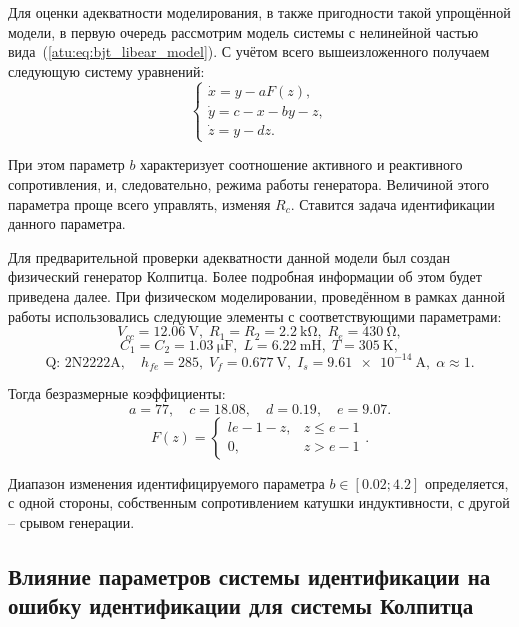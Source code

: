 Для оценки адекватности моделирования, в также пригодности
такой упрощённой модели, в первую очередь
рассмотрим модель системы с нелинейной частью вида~(\ref{atu:eq:bjt_libear_model}).
С учётом всего вышеизложенного получаем следующую систему уравнений:
%
\begin{equation}
\label{atu:eq:colp}
\begin{cases}
  \dot{x} = y - a F(z), \\
  \dot{y} = c - x - by - z, \\
  \dot{z} = y - d z.
\end{cases}
\end{equation}

При этом параметр $b$ характеризует соотношение
активного и реактивного сопротивления,
и, следовательно, режима работы генератора.
Величиной этого параметра проще всего управлять,
изменяя $R_c$.
Ставится задача идентификации данного параметра.


Для предварительной проверки адекватности данной модели
был создан физический генератор Колпитца.
Более подробная информации об этом будет приведена далее.
При физическом моделировании, проведённом в рамках данной работы использовались следующие
элементы с соответствующими параметрами:
%
\[
  V_{cc} = \SI{12.06}{\volt},          \;
  R_1 = R_2 = \SI{2.2}{\kilo\ohm},     \;
  R_e = \SI{430}{\ohm},
\]
%
\[
  C_1 = C_2 = \SI{1.03}{\micro\farad}, \;
  L = \SI{6.22}{\milli\henry},         \;
  T = \SI{305}{\kelvin},
\]
%
\[
  \text{Q: 2N2222A}, \quad
  h_{fe}=285, \;
  V_f = \SI{0.677}{\volt}, \;
  I_s = \SI{9.61e-14}{\ampere}, \;
  \alpha \approx 1.
\]

Тогда безразмерные коэффициенты:
\[
 a = 77,     \quad
 c = 18.08,  \quad
 d = 0.19,   \quad
 e = 9.07.
\]
%
\[
F(z) =
\begin{cases}{l}
  e-1-z, & z \le e-1  \\
  0,     & z  >  e-1
\end{cases}.
\]


Диапазон изменения идентифицируемого параметра
$b \in [ 0.02; 4.2 ]$
определяется, с одной стороны, собственным сопротивлением катушки индуктивности,
с другой -- срывом генерации.




\subsection{Влияние параметров системы идентификации на ошибку идентификации для системы Колпитца}  %



